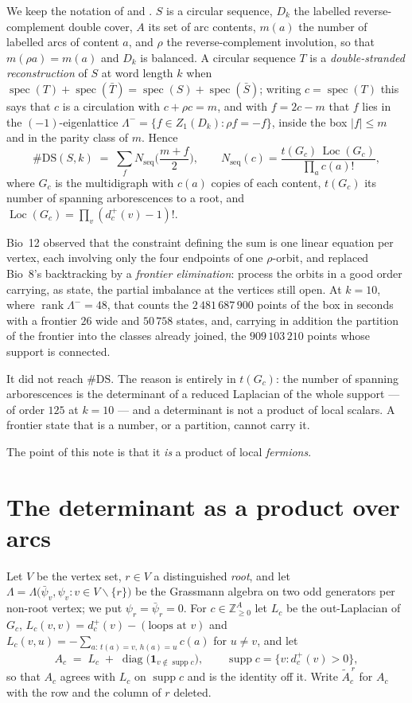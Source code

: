 \documentclass[11pt]{article}
\theoremstyle{plain}
\theoremstyle{definition}
\theoremstyle{remark}
\newcommand{\Z}{\mathbb{Z}}
\newcommand{\rank}{\operatorname{rank}}
\newcommand{\spec}{\operatorname{spec}}
\newcommand{\supp}{\operatorname{supp}}
\newcommand{\Loc}{\operatorname{Loc}}
\newcommand{\Nseq}{N_{\mathrm{seq}}}
\newcommand{\DS}{\mathrm{DS}}
\newcommand{\Lm}{\Lambda^{-}}
\newcommand{\bpsi}{\bar\psi}
\begin{document}
We keep the notation of \cite{Bio8} and \cite{Bio12}. $S$ is a circular sequence, $D_k$ the
labelled reverse-complement double cover, $A$ its set of arc contents, $m(a)$ the number of
labelled arcs of content $a$, and $\rho$ the reverse-complement involution, so that
$m(\rho a)=m(a)$ and $D_k$ is balanced. A circular sequence $T$ is a \emph{double-stranded
reconstruction} of $S$ at word length $k$ when $\spec(T)+\spec(\bar T)=\spec(S)+\spec(\bar S)$;
writing $c=\spec(T)$ this says that $c$ is a circulation with $c+\rho c=m$, and with
$f=2c-m$ that $f$ lies in the $(-1)$-eigenlattice $\Lm=\{f\in Z_1(D_k):\rho f=-f\}$, inside the
box $|f|\le m$ and in the parity class of $m$. Hence \cite[Thm.~7]{Bio8}
\begin{equation}\label{eq:sum}
\#\DS(S,k)\;=\;\sum_{f}\Nseq\Big(\frac{m+f}{2}\Big),
\qquad
\Nseq(c)=\frac{t(G_c)\,\Loc(G_c)}{\prod_a c(a)!},
\end{equation}
where $G_c$ is the multidigraph with $c(a)$ copies of each content, $t(G_c)$ its number of
spanning arborescences to a root, and $\Loc(G_c)=\prod_v(d^+_c(v)-1)!$.

Bio~12 observed that the constraint defining the sum is one linear equation per vertex, each
involving only the four endpoints of one $\rho$-orbit, and replaced Bio~8's backtracking by a
\emph{frontier elimination}: process the orbits in a good order carrying, as state, the partial
imbalance at the vertices still open. At $k=10$, where $\rank\Lm=48$, that counts the
$2\,481\,687\,900$ points of the box in seconds with a frontier $26$ wide and $50\,758$ states,
and, carrying in addition the partition of the frontier into the classes already joined, the
$909\,103\,210$ points whose support is connected.

It did not reach $\#\DS$. The reason is entirely in $t(G_c)$: the number of spanning
arborescences is the determinant of a reduced Laplacian of the whole support --- of order $125$
at $k=10$ --- and a determinant is not a product of local scalars. A frontier state that is a
number, or a partition, cannot carry it.

The point of this note is that it \emph{is} a product of local \emph{fermions}.

\section{The determinant as a product over arcs}\label{sec:berezin}

Let $V$ be the vertex set, $r\in V$ a distinguished \emph{root}, and let
$\Lambda=\Lambda\big(\bpsi_v,\psi_v: v\in V\smallsetminus\{r\}\big)$ be the Grassmann algebra on
two odd generators per non-root vertex; we put $\psi_r=\bpsi_r=0$. For $c\in\Z_{\ge0}^A$ let
$L_c$ be the out-Laplacian of $G_c$, $L_c(v,v)=d^+_c(v)-(\text{loops at }v)$ and
$L_c(v,u)=-\sum_{a:\,t(a)=v,\,h(a)=u}c(a)$ for $u\ne v$, and let
\begin{equation}\label{eq:Aprime}
A_c\;=\;L_c\;+\;\operatorname{diag}\big(\mathbf 1_{v\notin\supp c}\big),
\qquad \supp c=\{v: d^+_c(v)>0\},
\end{equation}
so that $A_c$ agrees with $L_c$ on $\supp c$ and is the identity off it. Write
$\widetilde A_c^{\,r}$ for $A_c$ with the row and the column of $r$ deleted.
\end{document}
